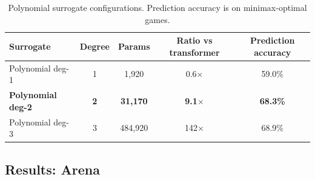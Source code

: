 \documentclass[11pt]{article}
\theoremstyle{definition}
\begin{document}
\begin{table}[H]
\centering\small
\begin{tabular}{lcccc}
\toprule
Surrogate & Degree & Params & Ratio vs transformer & Prediction accuracy \\
\midrule
Polynomial deg-1 & 1 & 1,920 & 0.6$\times$ & 59.0\% \\
\textbf{Polynomial deg-2} & \textbf{2} & \textbf{31,170} & \textbf{9.1$\times$} & \textbf{68.3\%} \\
Polynomial deg-3 & 3 & 484,920 & 142$\times$ & 68.9\% \\
\bottomrule
\end{tabular}
\caption{Polynomial surrogate configurations. Prediction accuracy is on minimax-optimal games.}
\label{tab:surrogate-configs}
\end{table}

\subsection{Results: Arena}
\end{document}
